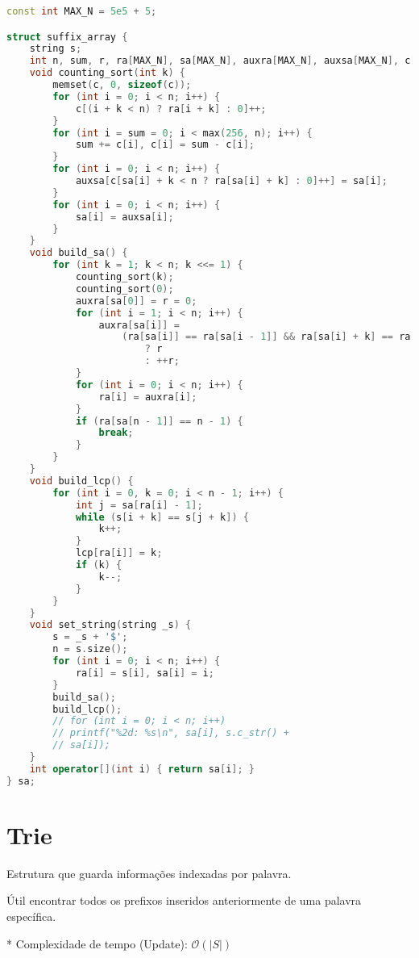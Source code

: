\documentclass[10pt, a4paper, oneside]{book}
\begin{document}
\begin{lstlisting}[language=C++]
const int MAX_N = 5e5 + 5;

struct suffix_array {
    string s;
    int n, sum, r, ra[MAX_N], sa[MAX_N], auxra[MAX_N], auxsa[MAX_N], c[MAX_N], lcp[MAX_N];
    void counting_sort(int k) {
        memset(c, 0, sizeof(c));
        for (int i = 0; i < n; i++) {
            c[(i + k < n) ? ra[i + k] : 0]++;
        }
        for (int i = sum = 0; i < max(256, n); i++) {
            sum += c[i], c[i] = sum - c[i];
        }
        for (int i = 0; i < n; i++) {
            auxsa[c[sa[i] + k < n ? ra[sa[i] + k] : 0]++] = sa[i];
        }
        for (int i = 0; i < n; i++) {
            sa[i] = auxsa[i];
        }
    }
    void build_sa() {
        for (int k = 1; k < n; k <<= 1) {
            counting_sort(k);
            counting_sort(0);
            auxra[sa[0]] = r = 0;
            for (int i = 1; i < n; i++) {
                auxra[sa[i]] =
                    (ra[sa[i]] == ra[sa[i - 1]] && ra[sa[i] + k] == ra[sa[i - 1] + k])
                        ? r
                        : ++r;
            }
            for (int i = 0; i < n; i++) {
                ra[i] = auxra[i];
            }
            if (ra[sa[n - 1]] == n - 1) {
                break;
            }
        }
    }
    void build_lcp() {
        for (int i = 0, k = 0; i < n - 1; i++) {
            int j = sa[ra[i] - 1];
            while (s[i + k] == s[j + k]) {
                k++;
            }
            lcp[ra[i]] = k;
            if (k) {
                k--;
            }
        }
    }
    void set_string(string _s) {
        s = _s + '$';
        n = s.size();
        for (int i = 0; i < n; i++) {
            ra[i] = s[i], sa[i] = i;
        }
        build_sa();
        build_lcp();
        // for (int i = 0; i < n; i++)
        // printf("%2d: %s\n", sa[i], s.c_str() +
        // sa[i]);
    }
    int operator[](int i) { return sa[i]; }
} sa;
\end{lstlisting}
\hfill

\section{Trie}


Estrutura que guarda informações indexadas por palavra.   



Útil encontrar todos os prefixos inseridos anteriormente de uma palavra específica.



* Complexidade de tempo (Update): $\mathcal{O}(|S|)$
\end{document}
